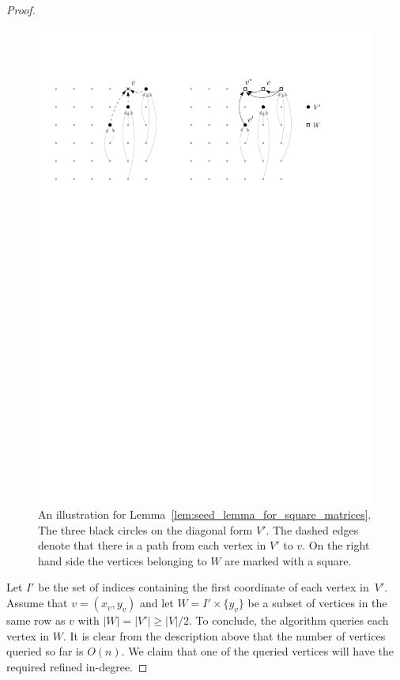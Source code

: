 \documentclass[runningheads,a4paper]{llncs}
\newcommand{\indegree}{refined in-degree\xspace}
\begin{document}
\begin{proof}
\begin{figure}[htbp] 
\centering
\includegraphics[scale=0.7]{seedlemma_fig1.pdf}
\caption{\small An illustration for Lemma~\ref{lem:seed_lemma_for_square_matrices}. The three black circles on the diagonal form $V'$. The dashed edges denote that there is a path from each vertex in $V'$ to $v$. On the right hand side the vertices belonging to $W$ are marked with a square. }
\label{fig:seedlem1}
\end{figure}

Let $I'$ be the set of indices containing the first coordinate of each vertex in~$V'$. 
Assume that $v = (x_v, y_v)$ and let $W = I'\times \{y_v\}$ be a subset of vertices in the same row as $v$ with $|W| = |V'|\geq |V|/2$.
To conclude, the algorithm queries each vertex in $W$.
It is clear from the description above that the number of vertices queried so far is $O(n)$. 
We claim that one of the queried vertices will have the required \indegree.


\end{proof}
\end{document}
